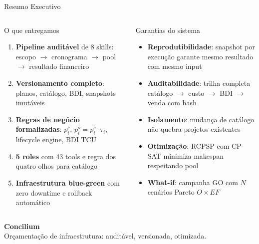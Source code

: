 \documentclass[aspectratio=169,10pt]{beamer}
\begin{document}
\begin{frame}{Resumo Executivo}
  \begin{columns}[T]
    \begin{block}{O que entregamos}
      \begin{enumerate}\small
        \item \textbf{Pipeline auditável} de 8 skills: escopo $\to$ cronograma $\to$ pool $\to$ resultado financeiro
        \item \textbf{Versionamento completo}: planos, catálogo, BDI, snapshots imutáveis
        \item \textbf{Regras de negócio formalizadas}: $p_i^c$, $p_i^o = p_i^c \cdot \tau_i$, lifecycle engine, BDI TCU
        \item \textbf{5 roles} com 43 tools e regra dos quatro olhos para catálogo
        \item \textbf{Infraestrutura blue-green} com zero downtime e rollback automático
      \end{enumerate}
    \end{block}

    \begin{block}{Garantias do sistema}
      \begin{itemize}\small
        \item \textbf{Reprodutibilidade}: snapshot por execução garante mesmo resultado com mesmo input
        \item \textbf{Auditabilidade}: trilha completa catálogo $\to$ custo $\to$ BDI $\to$ venda com hash
        \item \textbf{Isolamento}: mudança de catálogo não quebra projetos existentes
        \item \textbf{Otimização}: RCPSP com CP-SAT minimiza makespan respeitando pool
        \item \textbf{What-if}: campanha GO com $N$ cenários Pareto $O \times EF$
      \end{itemize}
    \end{block}
  \end{columns}
  \vspace{8pt}
  \begin{center}
    \Large\textbf{Concilium} \\[4pt]
    {\normalsize Orçamentação de infraestrutura: auditável, versionada, otimizada.}
  \end{center}
\end{frame}
\end{document}
